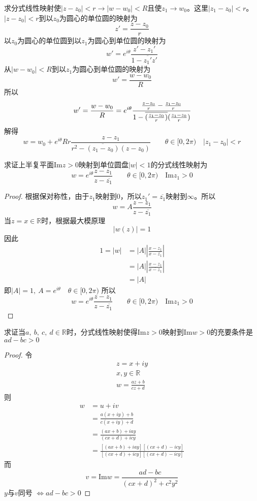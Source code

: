 \begin{homeworkProblem}
求分式线性映射使$|z-z_0|<r\longrightarrow|w-w_0|<R$且使$z_1\rightarrow w_0$。这里$|z_1-z_0|<r$。
\newline
\solution
$|z-z_0|<r$到以$z_0$为圆心的单位圆的映射为
\[
z' = \frac{z-z_0}{r}
\]
以$z_0$为圆心的单位圆到以$z_1$为圆心到单位圆的映射为
\[
w' = e^{i\theta}\frac{z'-z_1'}{1-\overline{z_1'}z'}
\]
从$|w-w_0|<R$到以$z_1$为圆心到单位圆的映射为
\[
w' = \frac{w-w_0}{R}
\]
所以
\[
w' = \frac{w-w_0}{R} = e^{i\theta}\cfrac{\frac{z-z_0}{r} - \frac{z_1-z_0}{r}}
{1 - \overline{(\frac{z_1-z_0}{r})}(\frac{z_1-z_0}{r})}
\]
解得
\[
w = w_0 + e^{i\theta}Rr\frac{z-z_1}{r^2-\overline{(z_1-z_0)}(z-z_0)} \qquad \theta\in[0,2\pi)\quad|z_1-z_0|<r
\]
\end{homeworkProblem}
\begin{homeworkProblem}
求证上半复平面$\mathrm{Im}z>0$映射到单位圆盘$|w|<1$的分式线性映射为
\[
w = e^{i\theta}\frac{z-z_1}{z-\overline{z_1}}\qquad\theta\in[0,2\pi)\quad\mathrm{Im}z_1>0
\]
\begin{proof}
根据保对称性，由于$z_1$映射到$0$，所以$z_1' = \overline{z_1}$映射到$\infty$。所以
\[w=A\frac{z-z_1}{z-\overline{z_1}}\]
当$z=x\in\mathbb{R}$时，根据最大模原理\[|w(z)| = 1\]
因此
\[
\begin{split}
1 = |w| &= |A|\left|\frac{x-z_1}{x-\overline{z_1}}\right| \\
&= |A|\left|\frac{x-z_1}{\overline{x-z_1}}\right| \\
&= |A|
\end{split}
\]
即$|A|=1,~A=e^{i\theta}\quad\theta\in[0,2\pi)$
所以
\[
w = e^{i\theta}\frac{z-z_1}{z-\overline{z_1}}\qquad\theta\in[0,2\pi)\quad\mathrm{Im}z_1>0
\]
\end{proof}
\end{homeworkProblem}

\begin{homeworkProblem}
    求证当$a,~b,~c,~d\in\mathbb{R}$时，分式线性映射使得$\mathrm{Im}z>0$映射到$\mathrm{Im}w>0$的充要条件是$ad-bc>0$
\begin{proof}
    令
\begin{gather*}
z = x+iy\\
x,y\in\mathbb{R}\\
w=\frac{az+b}{cz+d}
\end{gather*}
则
\[\begin{split}
w &= u+iv \\
&= \frac{a(x+iy)+b}{c(x+iy)+d}\\
&= \frac{(ax+b)+iay}{(cx+d)+icy}\\
&= \frac{[(ax+b)+iay][(cx+d)-icy]}{[(cx+d)+icy][(cx+d)-icy]}
\end{split}\]
而
\[
v = \mathrm{Im}w = \frac{ad-bc}{(cx+d)^2+c^2y^2}
\]
$y$与$v$同号
$
\Leftrightarrow ad-bc>0
$
\end{proof}
\end{homeworkProblem}

